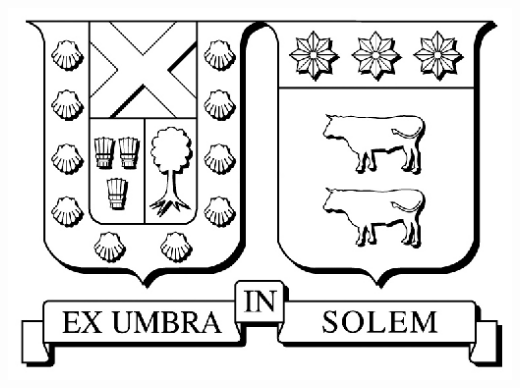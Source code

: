 \thispagestyle{empty}
\cleardoublepage%
\bigskip
\bigskip
\bigskip
\bigskip
\bigskip
\vspace{1cm}
\begin{center}
\includegraphics[scale=0.6]{fig/logo_usm}\\
\\
\bigskip
\end{center}
\vspace{2cm}
